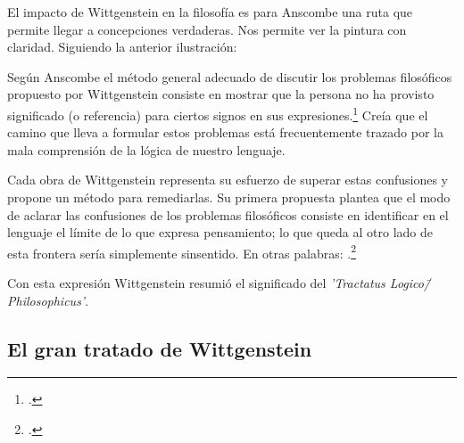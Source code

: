 El impacto de Wittgenstein en la filosofía es para Anscombe una ruta que permite
llegar a concepciones verdaderas. Nos permite ver la pintura con claridad.
Siguiendo la anterior ilustración:


Según Anscombe el método general adecuado de discutir los problemas filosóficos
propuesto por Wittgenstein consiste en mostrar que la persona no ha provisto
significado (o referencia) para ciertos signos en sus expresiones.\footcite[cf.
p. 151]{IWT} Creía que el camino que lleva a formular estos problemas está
frecuentemente trazado por la mala comprensión de la lógica de nuestro lenguaje.

Cada obra de Wittgenstein representa su esfuerzo de superar estas confusiones y
propone un método para remediarlas. Su primera propuesta plantea que el modo de
aclarar las confusiones de los problemas filosóficos consiste en identificar en
el lenguaje el límite de lo que expresa pensamiento; lo que queda al otro lado
de esta frontera sería simplemente sinsentido. En otras palabras:
.\footcite[prefacio]{tractatus}

Con esta expresión Wittgenstein resumió el significado del \emph{'Tractatus
Logico\=/Philosophicus'}.

\subsection{El gran tratado de Wittgenstein}


